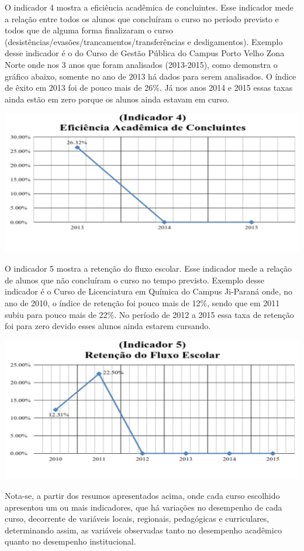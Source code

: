 \documentclass[article,12pt,onesidea,4paper,english,brazil]{abntex2}
\begin{document}
	O indicador 4 mostra a eficiência acadêmica de concluintes. Esse indicador mede a relação
	entre todos os alunos que concluíram o curso no período previsto e todos que de alguma forma
	finalizaram o curso (desistências/evasões/trancamentos/transferências e desligamentos). Exemplo
	desse indicador é o do Curso de Gestão Pública do Campus Porto Velho Zona Norte onde nos 3
	anos que foram analisados (2013-2015), como demonstra o gráfico abaixo, somente no ano de
	2013 há dados para serem analisados. O índice de êxito em 2013 foi de pouco mais de 26\%. Já
	nos anos 2014 e 2015 essas taxas ainda estão em zero porque os alunos ainda estavam em curso.
	\begin{center}
		\includegraphics[width=0.7\linewidth]{PIP-97-4}
	\end{center}

	O indicador 5 mostra a retenção do fluxo escolar. Esse indicador mede a relação de alunos
	que não concluíram o curso no tempo previsto. Exemplo desse indicador é o Curso de
	Licenciatura em Química do Campus Ji-Paraná onde, no ano de 2010, o índice de retenção foi
	pouco mais de 12\%, sendo que em 2011 subiu para pouco mais de 22\%. No período de 2012 a
	2015 essa taxa de retenção foi para zero devido esses alunos ainda estarem cursando.
	\begin{center}
		\includegraphics[width=0.7\linewidth]{PIP-97-5}
	\end{center}
	
	Nota-se, a partir dos resumos apresentados acima, onde cada curso escolhido apresentou um
	ou mais indicadores, que há variações no desempenho de cada curso, decorrente de variáveis
	locais, regionais, pedagógicas e curriculares, determinando assim, as variáveis observadas tanto no desempenho acadêmico quanto no desempenho institucional.
	
\end{document}
